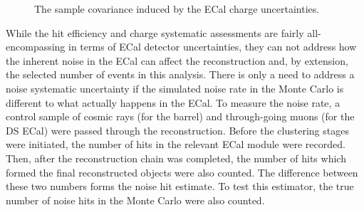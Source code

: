 \begin{figure}%
  \centering
  \caption{The sample covariance induced by the ECal charge uncertainties.}
  \label{fig:ECalChargeCovarianceMatrices}
\end{figure}
\newline
\newline
While the hit efficiency and charge systematic assessments are fairly all-encompassing in terms of ECal detector uncertainties, they can not address how the inherent noise in the ECal can affect the reconstruction and, by extension, the selected number of events in this analysis.  There is only a need to address a noise systematic uncertainty if the simulated noise rate in the Monte Carlo is different to what actually happens in the ECal.  
\newline
\newline
To measure the noise rate, a control sample  of cosmic rays (for the barrel) and through-going muons (for the DS ECal) were passed through the reconstruction.  Before the clustering stages were initiated, the number of hits in the relevant ECal module were recorded.  Then, after the reconstruction chain was completed, the number of hits which formed the final reconstructed objects were also counted.  The difference between these two numbers forms the noise hit estimate.  To test this estimator, the true number of noise hits in the Monte Carlo were also counted.
